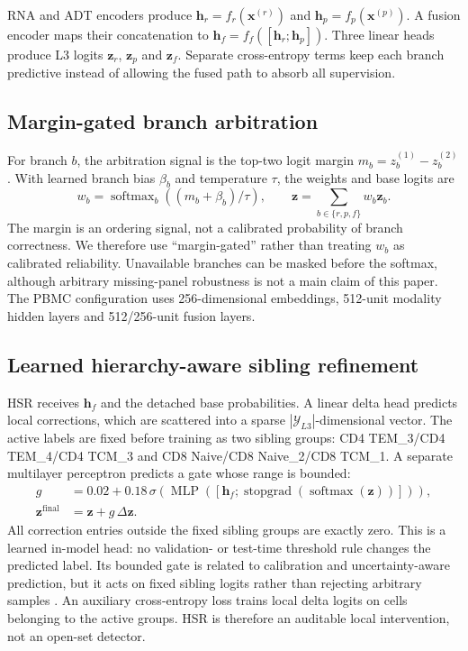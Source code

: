 \documentclass[unnumsec,webpdf,contemporary,large,numbered]{oup-authoring-template}
\begin{document}
RNA and ADT encoders produce $\mathbf{h}_{r}=f_r(\mathbf{x}^{(r)})$ and $\mathbf{h}_{p}=f_p(\mathbf{x}^{(p)})$. A fusion encoder maps their concatenation to $\mathbf{h}_{f}=f_f([\mathbf{h}_{r};\mathbf{h}_{p}])$. Three linear heads produce L3 logits $\mathbf{z}_{r}$, $\mathbf{z}_{p}$ and $\mathbf{z}_{f}$. Separate cross-entropy terms keep each branch predictive instead of allowing the fused path to absorb all supervision.

\subsection{Margin-gated branch arbitration}

For branch $b$, the arbitration signal is the top-two logit margin $m_b=z_b^{(1)}-z_b^{(2)}$. With learned branch bias $\beta_b$ and temperature $\tau$, the weights and base logits are
\begin{equation}
w_b=\operatorname{softmax}_b((m_b+\beta_b)/\tau),\qquad
\mathbf{z}=\sum_{b\in\{r,p,f\}} w_b\mathbf{z}_b.
\end{equation}
The margin is an ordering signal, not a calibrated probability of branch correctness. We therefore use ``margin-gated'' rather than treating $w_b$ as calibrated reliability. Unavailable branches can be masked before the softmax, although arbitrary missing-panel robustness is not a main claim of this paper. The PBMC configuration uses 256-dimensional embeddings, 512-unit modality hidden layers and 512/256-unit fusion layers.

\subsection{Learned hierarchy-aware sibling refinement}

HSR receives $\mathbf{h}_{f}$ and the detached base probabilities. A linear delta head predicts local corrections, which are scattered into a sparse $|\mathcal{Y}_{L3}|$-dimensional vector. The active labels are fixed before training as two sibling groups: CD4 TEM\_3/CD4 TEM\_4/CD4 TCM\_3 and CD8 Naive/CD8 Naive\_2/CD8 TCM\_1. A separate multilayer perceptron predicts a gate whose range is bounded:
\begin{equation}
\begin{aligned}
g &= 0.02+0.18\,\sigma(\operatorname{MLP}([\mathbf{h}_{f};
\operatorname{stopgrad}(\operatorname{softmax}(\mathbf{z}))])),\\
\mathbf{z}^{\mathrm{final}} &= \mathbf{z}+g\,\Delta\mathbf{z}.
\end{aligned}
\end{equation}
All correction entries outside the fixed sibling groups are exactly zero. This is a learned in-model head: no validation- or test-time threshold rule changes the predicted label. Its bounded gate is related to calibration and uncertainty-aware prediction, but it acts on fixed sibling logits rather than rejecting arbitrary samples \citep{guo2017calibration,lakshminarayanan2017,gal2016,hendrycks2017,geifman2017}. An auxiliary cross-entropy loss trains local delta logits on cells belonging to the active groups. HSR is therefore an auditable local intervention, not an open-set detector.
\end{document}
